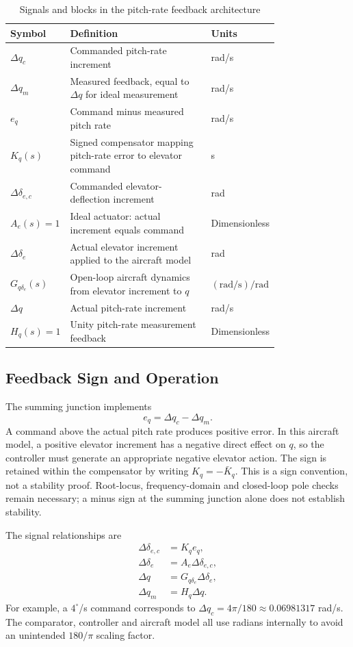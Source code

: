 \documentclass[a4paper,11pt]{article}
\newcommand{\de}{\delta_e}
\newcommand{\Gq}{G_{q\delta_e}}
\begin{document}
\begin{table}[H]\centering
\caption{Signals and blocks in the pitch-rate feedback architecture}
\begin{tabular}{p{0.22\linewidth}p{0.56\linewidth}l}\toprule
Symbol&Definition&Units\\\midrule
$\Delta q_c$&Commanded pitch-rate increment&rad/s\\
$\Delta q_m$&Measured feedback, equal to $\Delta q$ for ideal measurement&rad/s\\
$e_q$&Command minus measured pitch rate&rad/s\\
$K_q(s)$&Signed compensator mapping pitch-rate error to elevator command&s\\
$\Delta\delta_{e,c}$&Commanded elevator-deflection increment&rad\\
$A_e(s)=1$&Ideal actuator: actual increment equals command&Dimensionless\\
$\Delta\de$&Actual elevator increment applied to the aircraft model&rad\\
$\Gq(s)$&Open-loop aircraft dynamics from elevator increment to $q$&$(\mathrm{rad/s})/\mathrm{rad}$\\
$\Delta q$&Actual pitch-rate increment&rad/s\\
$H_q(s)=1$&Unity pitch-rate measurement feedback&Dimensionless\\\bottomrule
\end{tabular}
\end{table}

\subsection{Feedback Sign and Operation}
The summing junction implements
\begin{equation}\label{eq:error}
e_q=\Delta q_c-\Delta q_m.
\end{equation}
A command above the actual pitch rate produces positive error. In this aircraft model, a positive elevator increment has a negative direct effect on $q$, so the controller must generate an appropriate negative elevator action. The sign is retained within the compensator by writing $K_q=-\bar K_q$. This is a sign convention, not a stability proof. Root-locus, frequency-domain and closed-loop pole checks remain necessary; a minus sign at the summing junction alone does not establish stability.

The signal relationships are
\begin{align}
\Delta\delta_{e,c}&=K_q e_q,\\
\Delta\de&=A_e\Delta\delta_{e,c},\\
\Delta q&=\Gq\Delta\de,\\
\Delta q_m&=H_q\Delta q.
\end{align}
For example, a $4^\circ$/s command corresponds to $\Delta q_c=4\pi/180\approx0.06981317$ rad/s. The comparator, controller and aircraft model all use radians internally to avoid an unintended $180/\pi$ scaling factor.
\end{document}
